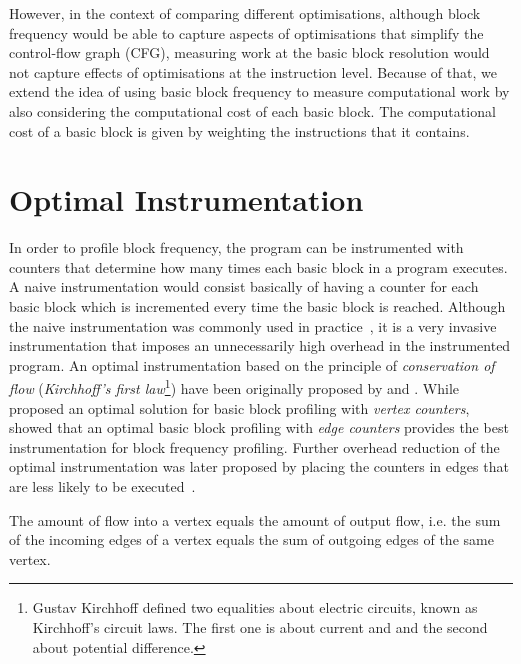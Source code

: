 However, in the context of comparing different optimisations, although block frequency would be able to capture aspects of optimisations that simplify the control-flow graph (CFG), measuring work at the basic block resolution would not capture effects of optimisations at the instruction level.
Because of that, we extend the idea of using basic block frequency to measure computational work by also considering the computational cost of each basic block.
The computational cost of a basic block is given by weighting the instructions that it contains.

\section{Optimal Instrumentation} \label{subsec:optimalInstrumentation}

In order to profile  block frequency, the program can be instrumented with counters that determine how many times each basic block in a program executes.
A naive instrumentation would consist basically of having a counter for each basic block which is incremented every time the basic block is reached.
Although the naive instrumentation was commonly used in practice~\citep{knuth71}, it is a very invasive instrumentation that imposes an unnecessarily high overhead in the instrumented program.
An optimal instrumentation based on the principle of \textit{conservation of flow} (\textit{Kirchhoff's first law}\footnote{Gustav Kirchhoff defined two equalities about electric circuits, known as Kirchhoff's circuit laws. The first one is about current and and the second about potential difference.}) have been originally proposed by \cite{nahapetian73} and \cite{knuth73}.
While \cite{knuth73} proposed an optimal solution for basic block profiling with \textit{vertex counters}, \cite{ball94} showed that an optimal basic block profiling with \textit{edge counters} provides the best instrumentation for block frequency profiling.
Further overhead reduction of the optimal instrumentation was later proposed by placing the counters in edges that are less likely to be executed~\cite{forman81,ball94}.

\begin{definition}
The amount of flow into a vertex equals the amount of output flow, i.e. the sum of the incoming edges of a vertex equals the sum of outgoing edges of the same vertex.
\end{definition}

